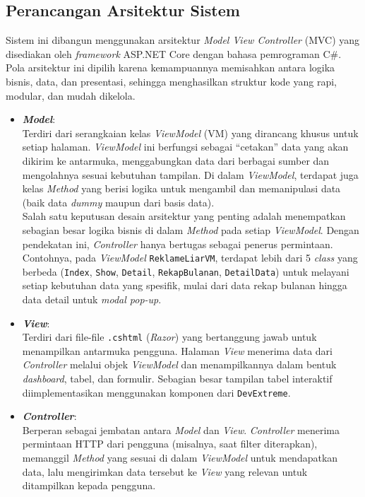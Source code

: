 \subsection{Perancangan Arsitektur Sistem}
Sistem ini dibangun menggunakan arsitektur \emph{Model View Controller} (MVC) yang disediakan oleh \emph{framework} ASP.NET Core dengan bahasa pemrograman C\#. Pola arsitektur ini dipilih karena kemampuannya memisahkan antara logika bisnis, data, dan presentasi, sehingga menghasilkan struktur kode yang rapi, modular, dan mudah dikelola.
\begin{itemize}
    \item \textbf{\emph{Model}}: \\
    Terdiri dari serangkaian kelas \emph{ViewModel} (VM) yang dirancang khusus untuk setiap halaman. \emph{ViewModel} ini berfungsi sebagai ``cetakan'' data yang akan dikirim ke antarmuka, menggabungkan data dari berbagai sumber dan mengolahnya sesuai kebutuhan tampilan. Di dalam \emph{ViewModel}, terdapat juga kelas \emph{Method} yang berisi logika untuk mengambil dan memanipulasi data (baik data \emph{dummy} maupun dari basis data). \\
    Salah satu keputusan desain arsitektur yang penting adalah menempatkan sebagian besar logika bisnis di dalam \emph{Method} pada setiap \emph{ViewModel}. Dengan pendekatan ini, \emph{Controller} hanya bertugas sebagai penerus permintaan. Contohnya, pada \emph{ViewModel} \texttt{ReklameLiarVM}, terdapat lebih dari 5 \emph{class} yang berbeda (\texttt{Index}, \texttt{Show}, \texttt{Detail}, \texttt{RekapBulanan}, \texttt{DetailData}) untuk melayani setiap kebutuhan data yang spesifik, mulai dari data rekap bulanan hingga data detail untuk \emph{modal pop-up}.
    \item \textbf{\emph{View}}: \\
    Terdiri dari file-file \texttt{.cshtml} (\emph{Razor}) yang bertanggung jawab untuk menampilkan antarmuka pengguna. Halaman \emph{View} menerima data dari \emph{Controller} melalui objek \emph{ViewModel} dan menampilkannya dalam bentuk \emph{dashboard}, tabel, dan formulir. Sebagian besar tampilan tabel interaktif diimplementasikan menggunakan komponen dari \texttt{DevExtreme}.
    \item \textbf{\emph{Controller}}: \\
    Berperan sebagai jembatan antara \emph{Model} dan \emph{View}. \emph{Controller} menerima permintaan HTTP dari pengguna (misalnya, saat filter diterapkan), memanggil \emph{Method} yang sesuai di dalam \emph{ViewModel} untuk mendapatkan data, lalu mengirimkan data tersebut ke \emph{View} yang relevan untuk ditampilkan kepada pengguna.
\end{itemize}

